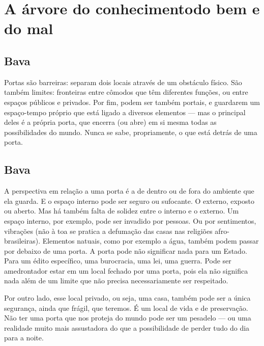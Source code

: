 \part[A árvore do conhecimento do bem e do mal]{A árvore do conhecimento\break do bem e do mal}


\chapter*{Bava }
\smallskip{}

Portas são barreiras: separam dois locais através de um obstáculo físico. São também limites: fronteiras entre cômodos que têm diferentes funções, ou entre espaços públicos e privados. Por fim, podem ser também portais, e guardarem um espaço-tempo próprio que está ligado a diversos elementos — mas o principal deles é a própria porta, que encerra (ou abre) em si mesma todas as possibilidades do mundo. Nunca se sabe, propriamente, o que está detrás de uma porta.

\chapter*{Bava }
\smallskip{}

A perspectiva em relação a uma porta é a de dentro ou de fora do ambiente que ela guarda. E o espaço interno pode ser seguro ou sufocante. O externo, exposto ou aberto. Mas há também falta de solidez entre o interno e o externo. Um espaço interno, por exemplo, pode ser invadido por pessoas. Ou por sentimentos, vibrações (não à toa se pratica a defumação das casas nas religiões afro-brasileiras). Elementos natuais, como por exemplo a água, também podem passar por debaixo de uma porta. A porta pode não significar nada para um Estado. Para um édito específico, uma burocracia, uma lei, uma guerra. Pode ser amedrontador estar em um local fechado por uma porta, pois ela não significa nada além de um limite que não precisa necessariamente ser respeitado. 

Por outro lado, esse local privado, ou seja, uma casa, também pode ser a única segurança, ainda que frágil, que teremos. É um local de vida e de preservação. Não ter uma porta que nos proteja do mundo pode ser um pesadelo — ou uma realidade muito mais assustadora do que a possibilidade de perder tudo do dia para a noite.

